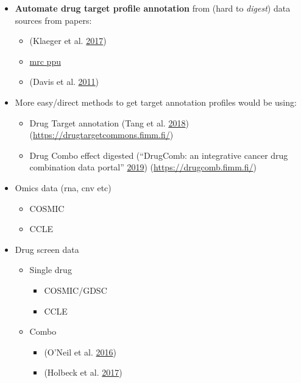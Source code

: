 \documentclass[
  12pt,
]{book}
\providecommand{\tightlist}{%
  \setlength{\itemsep}{0pt}\setlength{\parskip}{0pt}}
\begin{document}
\begin{itemize}
\tightlist
\item
  \textbf{Automate drug target profile annotation} from (hard to \emph{digest}) data sources from papers:

  \begin{itemize}
  \tightlist
  \item
    (Klaeger et al. \protect\hyperlink{ref-Klaeger2017}{2017})
  \item
    \href{http://www.kinase-screen.mrc.ac.uk/}{mrc ppu}
  \item
    (Davis et al. \protect\hyperlink{ref-Davis2011}{2011})
  \end{itemize}
\item
  More easy/direct methods to get target annotation profiles would be using:

  \begin{itemize}
  \tightlist
  \item
    Drug Target annotation (Tang et al. \protect\hyperlink{ref-Tang2018}{2018}) (\url{https://drugtargetcommons.fimm.fi/})
  \item
    Drug Combo effect digested (``DrugComb: an integrative cancer drug combination data portal'' \protect\hyperlink{ref-Zagidullin2019}{2019}) (\url{https://drugcomb.fimm.fi/})
  \end{itemize}
\item
  Omics data (rna, cnv etc)

  \begin{itemize}
  \tightlist
  \item
    COSMIC
  \item
    CCLE
  \end{itemize}
\item
  Drug screen data

  \begin{itemize}
  \tightlist
  \item
    Single drug

    \begin{itemize}
    \tightlist
    \item
      COSMIC/GDSC
    \item
      CCLE
    \end{itemize}
  \item
    Combo

    \begin{itemize}
    \tightlist
    \item
      (O'Neil et al. \protect\hyperlink{ref-ONeil2016}{2016})
    \item
      (Holbeck et al. \protect\hyperlink{ref-Holbeck2017}{2017})
    \end{itemize}
  \end{itemize}
\end{itemize}
\end{document}
